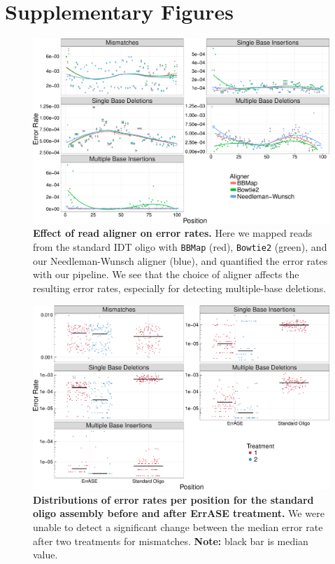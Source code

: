 \documentclass[letterpaper,12pt]{article}
\begin{document}
\section*{Supplementary Figures}
\begin{figure}[!ht]
\centering
\includegraphics[width=174mm]{aligners-1.pdf}
\caption{\small \textbf{Effect of read aligner on error rates.} Here we mapped reads from the standard IDT oligo with \texttt{BBMap} (red), \texttt{Bowtie2} (green), and our Needleman-Wunsch aligner (blue), and quantified the error rates with our pipeline. We see that the choice of aligner affects the resulting error rates, especially for detecting multiple-base deletions.}
\end{figure}

\clearpage
\begin{figure}[t]
\centering
\includegraphics[width=174mm]{nonDoped_vs_ErrASE-1.pdf}
\caption{\small \textbf{Distributions of error rates per position for the standard oligo assembly before and after ErrASE treatment.} We were unable to detect a significant change between the median error rate after two treatments for mismatches. \textbf{Note:} black bar is median value.}
\end{figure}
\end{document}
